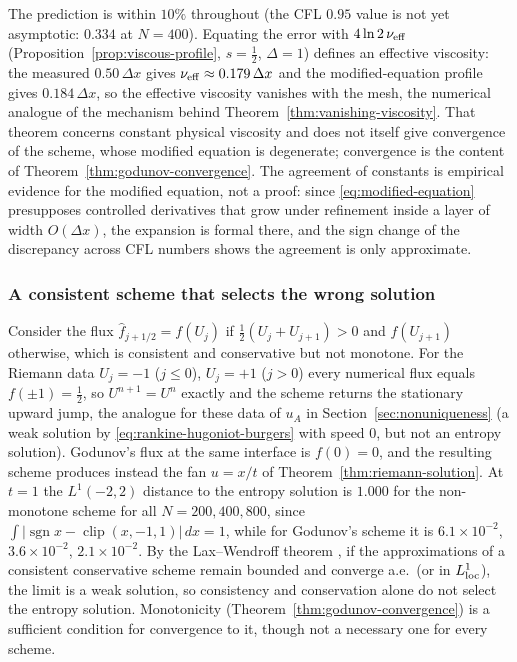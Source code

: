 The prediction is within $10\%$ throughout (the CFL $0.95$ value is not yet
asymptotic: $0.334$ at $N=400$). Equating the error with $4\ln2\,\nu_{\rm eff}$
(Proposition~\ref{prop:viscous-profile}, $s=\tfrac12$, $\Delta=1$) defines an
effective viscosity: the measured $0.50\,\Delta x$ gives
$\nu_{\rm eff}\approx0.179\,\Delta x$ and the modified-equation profile gives
$0.184\,\Delta x$, so the effective viscosity vanishes with the mesh, the numerical
analogue of the mechanism behind Theorem~\ref{thm:vanishing-viscosity}. That theorem
concerns constant physical viscosity and does not itself give convergence of the
scheme, whose modified equation is degenerate; convergence is the content of
Theorem~\ref{thm:godunov-convergence}. The agreement of constants is empirical
evidence for the modified equation, not a proof: since
\eqref{eq:modified-equation} presupposes controlled derivatives that grow under
refinement inside a layer of width $O(\Delta x)$, the expansion is formal there, and
the sign change of the discrepancy across CFL numbers shows the agreement is only
approximate.

\subsubsection{A consistent scheme that selects the wrong solution}
\label{subsubsec:non-entropy}

Consider the flux $\widehat f_{j+1/2}=f(U_j)$ if $\tfrac12(U_j+U_{j+1})>0$ and
$f(U_{j+1})$ otherwise, which is consistent and conservative but not monotone.
For the Riemann data $U_j=-1$ ($j\le0$), $U_j=+1$ ($j>0$) every numerical flux
equals $f(\pm1)=\tfrac12$, so $U^{n+1}=U^n$ exactly and the scheme returns the
stationary upward jump, the analogue for these data of $u_A$ in
Section~\ref{sec:nonuniqueness} (a weak solution by
\eqref{eq:rankine-hugoniot-burgers} with speed $0$, but not an entropy solution).
Godunov's flux at the same interface is $f(0)=0$, and the resulting scheme
produces instead the fan $u=x/t$ of Theorem~\ref{thm:riemann-solution}. At $t=1$ the $L^1(-2,2)$
distance to the entropy solution is $1.000$ for the non-monotone scheme for all
$N=200,400,800$, since $\int|\operatorname{sgn}x-\operatorname{clip}(x,-1,1)|\,dx=1$, while for
Godunov's scheme it is $6.1\times10^{-2}$, $3.6\times10^{-2}$,
$2.1\times10^{-2}$. By the Lax--Wendroff theorem \cite[Ch.~12]{leveque2002}, if the approximations
of a consistent conservative scheme remain bounded and converge a.e.\ (or in
$L^1_{\rm loc}$), the limit is a weak solution, so consistency and conservation
alone do not select the entropy solution. Monotonicity
(Theorem~\ref{thm:godunov-convergence}) is a sufficient condition for convergence
to it, though not a necessary one for every scheme.